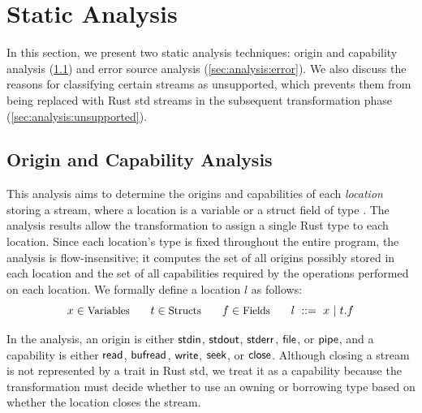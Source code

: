 \section{Static Analysis}
\label{sec:analysis}

In this section, we present two static analysis techniques:
%
origin and capability analysis (\cref{sec:analysis:oricap}) and error source
analysis (\cref{sec:analysis:error}).
%
We also discuss the reasons for classifying certain streams as unsupported,
which prevents them from being replaced with Rust std streams in the subsequent
transformation phase (\cref{sec:analysis:unsupported}).
%

\subsection{Origin and Capability Analysis}
\label{sec:analysis:oricap}

This analysis aims to determine the origins and capabilities of each
\emph{location} storing a stream, where a location is a variable or a struct
field of type .
%
The analysis results allow the transformation to assign a single Rust type to
each location.
%
Since each location's type is fixed throughout the entire program, the analysis
is flow-insensitive;
%
it computes the set of all origins possibly stored in each location and the set
of all capabilities required by the operations performed on each location.
%
We formally define a location $l$ as follows:
%
\[
  \small
  x\in\textrm{Variables}\qquad
  t\in\textrm{Structs}\qquad
  f\in\textrm{Fields}\qquad
  l\ ::=\ x\ |\ t.f
\]

In the analysis, an origin is either ${\sf stdin}$, ${\sf stdout}$, ${\sf stderr}$,
${\sf file}$, or ${\sf pipe}$, and a capability is either ${\sf read}$, ${\sf bufread}$,
${\sf write}$, ${\sf seek}$, or ${\sf close}$.
%
Although closing a stream is not represented by a trait in Rust std, we treat it
as a capability because the transformation must decide whether to use an owning
or borrowing type based on whether the location closes the stream.

